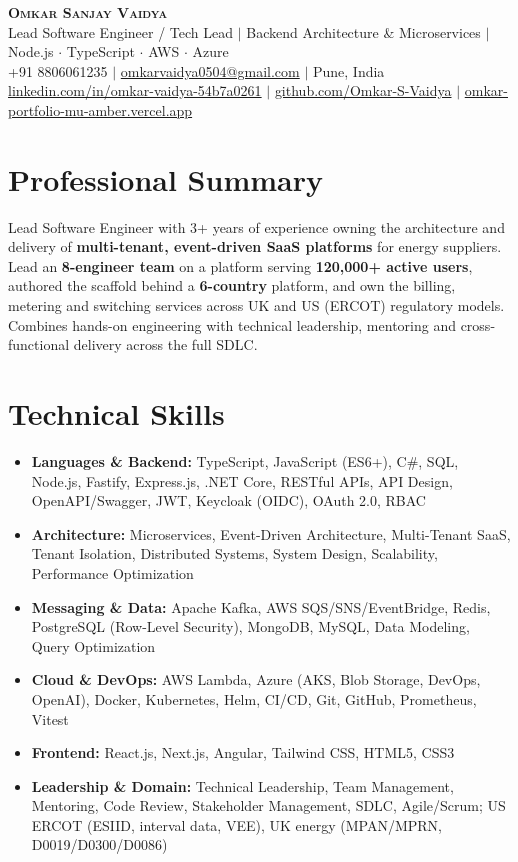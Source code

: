 \documentclass[letterpaper,10pt]{article}
\newcommand{\resumeItem}[1]{\item\small{{#1 \vspace{-2pt}}}}
\newcommand{\resumeSubItem}[1]{\resumeItem{#1}\vspace{-2pt}}
\newcommand{\resumeSubHeadingListStart}{\begin{itemize}[leftmargin=0.15in, label={}]}
\newcommand{\resumeSubHeadingListEnd}{\end{itemize}}
\begin{document}
\begin{center}
\textbf{\Huge \scshape Omkar Sanjay Vaidya} \\ \vspace{2pt}
\large Lead Software Engineer / Tech Lead $|$ Backend Architecture \& Microservices $|$ Node.js $\cdot$ TypeScript $\cdot$ AWS $\cdot$ Azure \\ \vspace{2pt}
\small +91 8806061235 $|$
\href{mailto:omkarvaidya0504@gmail.com}{omkarvaidya0504@gmail.com} $|$
Pune, India \\
\href{https://www.linkedin.com/in/omkar-vaidya-54b7a0261/}{linkedin.com/in/omkar-vaidya-54b7a0261} $|$
\href{https://github.com/Omkar-S-Vaidya}{github.com/Omkar-S-Vaidya} $|$
\href{https://omkar-portfolio-mu-amber.vercel.app/}{omkar-portfolio-mu-amber.vercel.app}
\end{center}

\section{Professional Summary}
\small{Lead Software Engineer with 3+ years of experience owning the architecture and delivery of \textbf{multi-tenant, event-driven SaaS platforms} for energy suppliers. Lead an \textbf{8-engineer team} on a platform serving \textbf{120,000+ active users}, authored the scaffold behind a \textbf{6-country} platform, and own the billing, metering and switching services across UK and US (ERCOT) regulatory models. Combines hands-on engineering with technical leadership, mentoring and cross-functional delivery across the full SDLC.}

\section{Technical Skills}
\resumeSubHeadingListStart
\resumeSubItem{\textbf{Languages \& Backend:} TypeScript, JavaScript (ES6+), C\#, SQL, Node.js, Fastify, Express.js, .NET Core, RESTful APIs, API Design, OpenAPI/Swagger, JWT, Keycloak (OIDC), OAuth 2.0, RBAC}
\resumeSubItem{\textbf{Architecture:} Microservices, Event-Driven Architecture, Multi-Tenant SaaS, Tenant Isolation, Distributed Systems, System Design, Scalability, Performance Optimization}
\resumeSubItem{\textbf{Messaging \& Data:} Apache Kafka, AWS SQS/SNS/EventBridge, Redis, PostgreSQL (Row-Level Security), MongoDB, MySQL, Data Modeling, Query Optimization}
\resumeSubItem{\textbf{Cloud \& DevOps:} AWS Lambda, Azure (AKS, Blob Storage, DevOps, OpenAI), Docker, Kubernetes, Helm, CI/CD, Git, GitHub, Prometheus, Vitest}
\resumeSubItem{\textbf{Frontend:} React.js, Next.js, Angular, Tailwind CSS, HTML5, CSS3}
\resumeSubItem{\textbf{Leadership \& Domain:} Technical Leadership, Team Management, Mentoring, Code Review, Stakeholder Management, SDLC, Agile/Scrum; US ERCOT (ESIID, interval data, VEE), UK energy (MPAN/MPRN, D0019/D0300/D0086)}
\resumeSubHeadingListEnd
\end{document}
